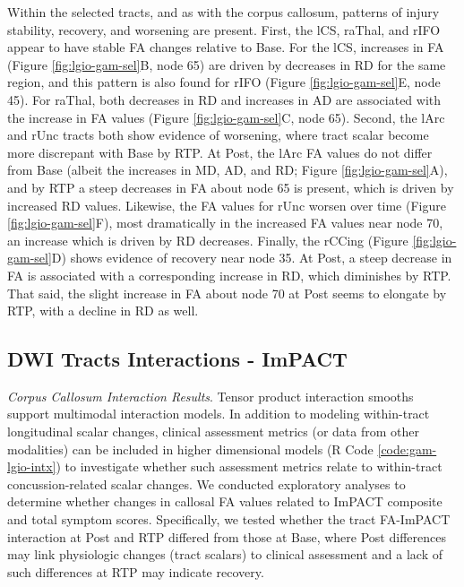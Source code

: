 \documentclass[12pt]{article}
\begin{document}
Within the selected tracts, and as with the corpus callosum, patterns of injury stability, recovery, and worsening are present. First, the lCS, raThal, and rIFO appear to have stable FA changes relative to Base. For the lCS, increases in FA (Figure \ref{fig:lgio-gam-sel}B, node 65) are driven by decreases in RD for the same region, and this pattern is also found for rIFO (Figure \ref{fig:lgio-gam-sel}E, node 45). For raThal, both decreases in RD and increases in AD are associated with the increase in FA values (Figure \ref{fig:lgio-gam-sel}C, node 65). Second, the lArc and rUnc tracts both show evidence of worsening, where tract scalar become more discrepant with Base by RTP. At Post, the lArc FA values do not differ from Base (albeit the increases in MD, AD, and RD; Figure \ref{fig:lgio-gam-sel}A), and by RTP a steep decreases in FA about node 65 is present, which is driven by increased RD values. Likewise, the FA values for rUnc worsen over time (Figure \ref{fig:lgio-gam-sel}F), most dramatically in the increased FA values near node 70, an increase which is driven by RD decreases. Finally, the rCCing (Figure \ref{fig:lgio-gam-sel}D) shows evidence of recovery near node 35. At Post, a steep decrease in FA is associated with a corresponding increase in RD, which diminishes by RTP. That said, the slight increase in FA about node 70 at Post seems to elongate by RTP, with a decline in RD as well.


\subsection{DWI Tracts Interactions - ImPACT}
\label{ssec:res-dwi-imp}
\textit{Corpus Callosum Interaction Results}. Tensor product interaction smooths support multimodal interaction models. In addition to modeling within-tract longitudinal scalar changes, clinical assessment metrics (or data from other modalities) can be included in higher dimensional models (R Code \ref{code:gam-lgio-intx}) to investigate whether such assessment metrics relate to within-tract concussion-related scalar changes. We conducted exploratory analyses to determine whether changes in callosal FA values related to ImPACT composite and total symptom scores. Specifically, we tested whether the tract FA-ImPACT interaction at Post and RTP differed from those at Base, where Post differences may link physiologic changes (tract scalars) to clinical assessment and a lack of such differences at RTP may indicate recovery.
\end{document}
